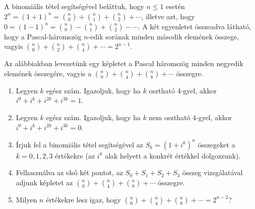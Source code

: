 \documentclass[11pt,a4paper]{article}
\begin{document}
A binomiális tétel segítségével beláttuk, hogy $n\leq 1$ esetén $2^n = (1+1)^n =
\binom{n}{0} + \binom{n}{1}  + \binom{n}{2} + \cdots$, illetve azt, hogy
$0 = (1-1)^n = \binom{n}{0} - \binom{n}{1}  + \binom{n}{2} -
\cdots$. A két egyenletet összeadva látható, hogy a
Pascal-háromszög $n$-edik sorának minden második elemének összege,
vagyis $\binom{n}{0} + \binom{n}{2} + \binom{n}{4} + \cdots = 2^{n-1}$.

Az alábbiakban levezetünk egy képletet a Pascal háromszög minden
negyedik elemének összegére, vagyis a $\binom{n}{0} + \binom{n}{4} +
\binom{n}{8} + \cdots$ összegre.

\begin{enumerate}


\item Legyen $k$ egész szám. Igazoljuk, hogy ha $k$ osztható
4-gyel, akkor $i^{0} + i^{k} + i^{2k} + i^{3k} = 1$.


\item Legyen $k$ egész szám. Igazoljuk, hogy ha $k$ nem osztható
4-gyel, akkor $i^{0} + i^{k} + i^{2k} + i^{3k} = 0$.

\item Írjuk fel a binomiális tétel segítségével az $S_k = (1+i^k)^n$
összegeket a $k=0, 1, 2, 3$ értékekre (az $i^k$ alak helyett a konkrét
értékkel dolgozzunk).

\item Felhasználva az első két pontot, az $S_0+S_1 + S_2 + S_3$ összeg
vizsgálatával adjunk képletet az $\binom{n}{0} + \binom{n}{4} +
\binom{n}{8} + \cdots$ összegre.

\item Milyen $n$ értékekre lesz igaz, hogy $\binom{n}{0} + \binom{n}{4} +
\binom{n}{8} + \cdots = 2^{n-2}$?



\end{enumerate}
\end{document}
